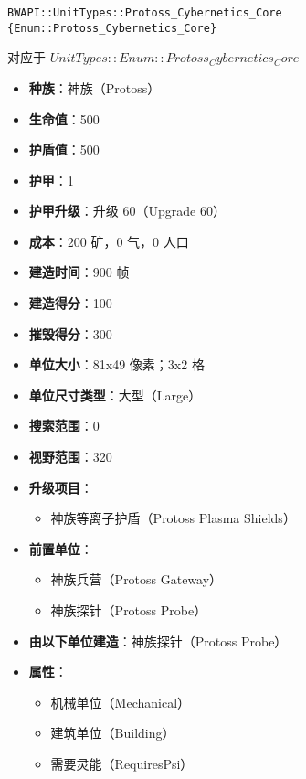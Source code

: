 \begin{tcolorbox}[colback=white, colframe=black!60!white, title=Protoss\_Cybernetics\_Core(), arc=0mm]
    \begin{verbatim}
BWAPI::UnitTypes::Protoss_Cybernetics_Core {Enum::Protoss_Cybernetics_Core}
    \end{verbatim}
    对应于  $ UnitTypes::Enum::Protoss_Cybernetics_Core $ 
    \begin{itemize}
        \item \textbf{种族}：神族（Protoss）
        \item \textbf{生命值}：500
        \item \textbf{护盾值}：500
        \item \textbf{护甲}：1
        \item \textbf{护甲升级}：升级 60（Upgrade 60）
        \item \textbf{成本}：200 矿，0 气，0 人口
        \item \textbf{建造时间}：900 帧
        \item \textbf{建造得分}：100
        \item \textbf{摧毁得分}：300
        \item \textbf{单位大小}：81x49 像素；3x2 格
        \item \textbf{单位尺寸类型}：大型（Large）
        \item \textbf{搜索范围}：0
        \item \textbf{视野范围}：320
        \item \textbf{升级项目}：
            \begin{itemize}
                \item 神族等离子护盾（Protoss Plasma Shields）
            \end{itemize}
        \item \textbf{前置单位}：
            \begin{itemize}
                \item 神族兵营（Protoss Gateway）
                \item 神族探针（Protoss Probe）
            \end{itemize}
        \item \textbf{由以下单位建造}：神族探针（Protoss Probe）
        \item \textbf{属性}：
            \begin{itemize}
                \item 机械单位（Mechanical）
                \item 建筑单位（Building）
                \item 需要灵能（RequiresPsi）
            \end{itemize}
    \end{itemize}
\end{tcolorbox}

